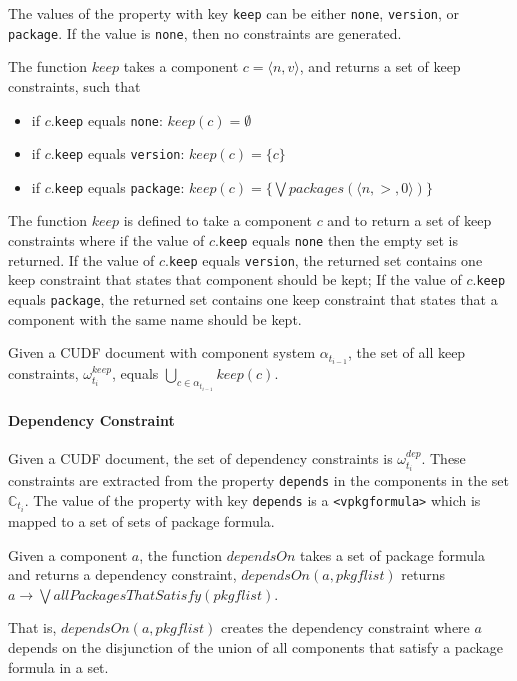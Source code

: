 The values of the property with key \texttt{keep} can be either \texttt{none}, \texttt{version}, or \texttt{package}.
If the value is \texttt{none}, then no constraints are generated.
\begin{defs}
The function $keep$ takes a component $c = \langle n ,v \rangle$, and returns a set of keep constraints, such that
\begin{itemize}
	\item if $c$.\verb+keep+ equals \verb+none+: $keep(c) = \emptyset$
	\item if $c$.\verb+keep+ equals \verb+version+: $keep(c) = \{c\}$
	\item if $c$.\verb+keep+ equals \verb+package+: $keep(c) = \{\bigvee packages(\langle n, >, 0 \rangle)\}$
\end{itemize}
\end{defs}
The function $keep$ is defined to take a component $c$ and to return a set of keep  constraints where
if the value of $c$.\verb+keep+ equals \verb+none+ then the empty set is returned.
If the value of $c$.\verb+keep+ equals \verb+version+, the returned set contains one keep  constraint that states that component should be kept;
If the value of $c$.\verb+keep+ equals \verb+package+, 
the returned set contains one keep  constraint that states that a component with the same name should be kept. 

\begin{defs}
Given a CUDF document with component system $\alpha_{t_{i-1}}$, the set of all keep  constraints, $\omega_{t_i}^{keep}$, 
equals $\bigcup \limits_{c \in \alpha_{t_{i-1}}} keep(c)$.
\end{defs}

\paragraph{Dependency Constraint}
Given a CUDF document, the set of dependency  constraints is $\omega_{t_i}^{dep}$.
These constraints are extracted from the property \texttt{depends} in the components in the set $\mathbb{C}_{t_i}$.
The value of the property with key \texttt{depends} is a \texttt{<vpkgformula>} which is mapped to a set of sets of package formula.

\begin{defs}
Given a component $a$, the function $dependsOn$ takes a set of package formula and returns a dependency  constraint,
$dependsOn(a,pkgflist)$ returns $a \rightarrow \bigvee allPackagesThatSatisfy(pkgflist)$.
\end{defs}
That is, $dependsOn(a,pkgflist)$ creates the dependency  constraint where $a$ depends on the disjunction of the union of all components that satisfy a package formula in a set. 

